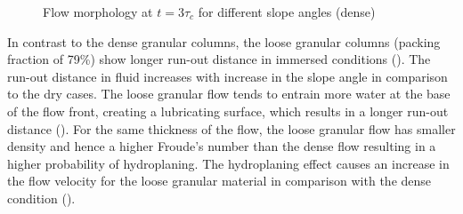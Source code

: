 \begin{figure}
\caption{Flow morphology at $t = 3 \tau_c$ for different slope angles (dense)}
\label{fig:slope_dense}
\end{figure}

In contrast to the dense granular columns, the loose granular columns (packing 
fraction of 79\%) show longer run-out distance in immersed conditions 
(). The run-out distance in fluid increases with 
increase in the slope angle in comparison to the dry cases. The loose granular 
flow tends to entrain more water at the base of the flow 
front, creating a lubricating surface, which results in a longer run-out 
distance (). For the same thickness of the flow, 
the loose granular flow has smaller density and hence a higher Froude's number 
than the dense flow resulting in a higher probability of hydroplaning. The 
hydroplaning effect causes an increase in the flow velocity for the loose 
granular material in comparison with the dense condition 
().

